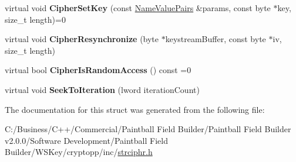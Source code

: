 \begin{DoxyCompactItemize}
\item 
\hypertarget{struct_additive_cipher_abstract_policy_a906b4001cc8c457d1abb4bff4fb8157a}{
virtual void {\bfseries CipherSetKey} (const \hyperlink{class_name_value_pairs}{NameValuePairs} \&params, const byte $\ast$key, size\_\-t length)=0}
\label{struct_additive_cipher_abstract_policy_a906b4001cc8c457d1abb4bff4fb8157a}

\item 
\hypertarget{struct_additive_cipher_abstract_policy_ae00639d9aeb20b7da3ac5e3a0f877fa0}{
virtual void {\bfseries CipherResynchronize} (byte $\ast$keystreamBuffer, const byte $\ast$iv, size\_\-t length)}
\label{struct_additive_cipher_abstract_policy_ae00639d9aeb20b7da3ac5e3a0f877fa0}

\item 
\hypertarget{struct_additive_cipher_abstract_policy_abdac73ff69a1b36d32871c110f28413a}{
virtual bool {\bfseries CipherIsRandomAccess} () const =0}
\label{struct_additive_cipher_abstract_policy_abdac73ff69a1b36d32871c110f28413a}

\item 
\hypertarget{struct_additive_cipher_abstract_policy_a8fce38d2b7d84732fc3efea410b82d54}{
virtual void {\bfseries SeekToIteration} (lword iterationCount)}
\label{struct_additive_cipher_abstract_policy_a8fce38d2b7d84732fc3efea410b82d54}

\end{DoxyCompactItemize}


The documentation for this struct was generated from the following file:\begin{DoxyCompactItemize}
\item 
C:/Business/C++/Commercial/Paintball Field Builder/Paintball Field Builder v2.0.0/Software Development/Paintball Field Builder/WSKey/cryptopp/inc/\hyperlink{strciphr_8h}{strciphr.h}\end{DoxyCompactItemize}
